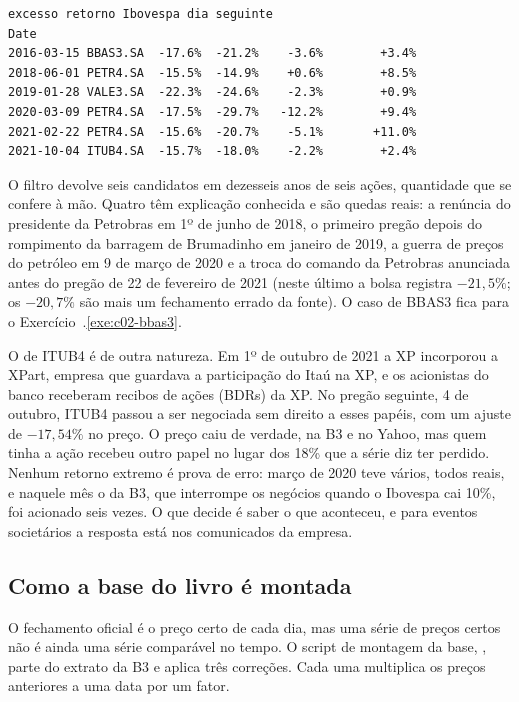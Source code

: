 \begin{lstlisting}[style=saida]
                    excesso retorno Ibovespa dia seguinte
Date
2016-03-15 BBAS3.SA  -17.6%  -21.2%    -3.6%        +3.4%
2018-06-01 PETR4.SA  -15.5%  -14.9%    +0.6%        +8.5%
2019-01-28 VALE3.SA  -22.3%  -24.6%    -2.3%        +0.9%
2020-03-09 PETR4.SA  -17.5%  -29.7%   -12.2%        +9.4%
2021-02-22 PETR4.SA  -15.6%  -20.7%    -5.1%       +11.0%
2021-10-04 ITUB4.SA  -15.7%  -18.0%    -2.2%        +2.4%
\end{lstlisting}

O filtro devolve seis candidatos em dezesseis anos de seis ações, quantidade que se confere à mão. Quatro têm explicação conhecida e são quedas reais: a renúncia do presidente da Petrobras em 1º de junho de 2018, o primeiro pregão depois do rompimento da barragem de Brumadinho em janeiro de 2019, a guerra de preços do petróleo em 9 de março de 2020 e a troca do comando da Petrobras anunciada antes do pregão de 22 de fevereiro de 2021 (neste último a bolsa registra $-21,5\%$; os $-20,7\%$ são mais um fechamento errado da fonte). O caso de BBAS3 fica para o Exercício~\thechapter.\ref{exe:c02-bbas3}.

O de ITUB4 é de outra natureza. Em 1º de outubro de 2021 a XP incorporou a XPart, empresa que guardava a participação do Itaú na XP, e os acionistas do banco receberam recibos de ações (BDRs) da XP. No pregão seguinte, 4 de outubro, ITUB4 passou a ser negociada sem direito a esses papéis, com um ajuste de $-17,54\%$ no preço. O preço caiu de verdade, na B3 e no Yahoo, mas quem tinha a ação recebeu outro papel no lugar dos 18\% que a série diz ter perdido. Nenhum retorno extremo é prova de erro: março de 2020 teve vários, todos reais, e naquele mês o  da B3, que interrompe os negócios quando o Ibovespa cai 10\%, foi acionado seis vezes. O que decide é saber o que aconteceu, e para eventos societários a resposta está nos comunicados da empresa.

\subsection{Como a base do livro é montada}

O fechamento oficial é o preço certo de cada dia, mas uma série de preços certos não é ainda uma série comparável no tempo. O script de montagem da base, , parte do extrato da B3 e aplica três correções. Cada uma multiplica os preços anteriores a uma data por um fator.

